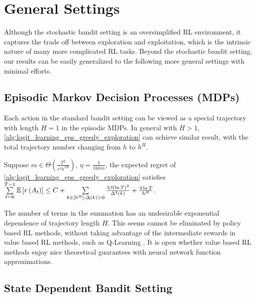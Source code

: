 \section{General Settings}
\label{sec:general_settings}
Although the stochastic bandit setting is an oversimplified RL environment, it captures the trade off between exploration and exploitation, which is the intrinsic nature of many more complicated RL tasks. Beyond the stochastic bandit setting, our results can be easily generalized to the following more general settings with minimal efforts.

\subsection{Episodic Markov Decision Processes (MDPs)}

Each action in the standard bandit setting can be viewed as a special trajectory with length $H = 1$ in the episodic MDPs. In general with $H > 1$, \cref{alg:logit_learning_eps_greedy_exploration} can achieve similar result, with the total trajectory number changing from $h$ to $h^H$.
\begin{thm}
\label{thm:episodic_mdp_setting}
     Suppose $m \in \Theta\left( \frac{T^2}{c^4 h^{2H}} \right)$, $\eta = \frac{ 1 }{16 h m}$, the expected regret of \cref{alg:logit_learning_eps_greedy_exploration} satisfies $\sum\limits_{t=0}^{T-1}{ {\mathbb{E}} \left[ r\left(A_t\right) \right] } \le C + \sum\limits_{k \in [h^H] : \Delta(k) > 0}{ \frac{ 3 \beta \left( \ln{T} \right)^2}{\Delta^2(k)} }  + \frac{ 3 \ln{T}}{h^H}$.
\end{thm}

The number of terms in the summation has an undesirable exponential dependence of trajectory length $H$. This seems cannot be eliminated by policy based RL methods, without taking advantage of the intermediate rewards in value based RL methods, such as Q-Learning \citep{jin2018q}. It is open whether value based RL methods enjoy nice theoretical guarantees with neural network function approximations.

\subsection{State Dependent Bandit Setting}


